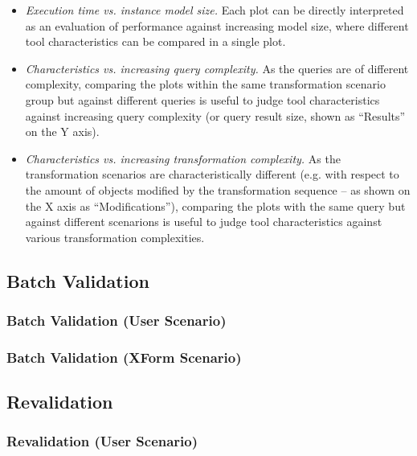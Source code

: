 \begin{itemize}
  \item \emph{Execution time vs. instance model size.} Each plot can be directly interpreted as an evaluation of performance against increasing model size, where different tool characteristics can be compared in a single plot.
  \item \emph{Characteristics vs. increasing query complexity.} As the queries are of different complexity, comparing the plots within the same transformation scenario group but against different queries is useful to judge tool characteristics against increasing query complexity (or query result size, shown as ``Results'' on the Y axis).
  \item \emph{Characteristics vs. increasing transformation complexity.} As the transformation scenarios are characteristically different (e.g. with respect to the amount of objects modified by the transformation sequence -- as shown on the X axis as ``Modifications''), comparing the plots with the same query but against different scenarions is useful to judge tool characteristics against various transformation complexities.
\end{itemize}



\subsection{Batch Validation}
\label{sec:results:batchvalidation}
\subsubsection{Batch Validation (User Scenario)}
\subsubsection{Batch Validation (XForm Scenario)}

\subsection{Revalidation}
\label{sec:results:revalidation}
\subsubsection{Revalidation (User Scenario)}
